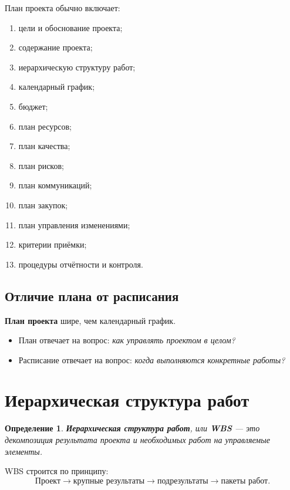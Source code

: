 \documentclass[12pt,a4paper]{article}
\newtheorem{definition}{Определение}
\begin{document}
План проекта обычно включает:
\begin{enumerate}
    \item цели и обоснование проекта;
    \item содержание проекта;
    \item иерархическую структуру работ;
    \item календарный график;
    \item бюджет;
    \item план ресурсов;
    \item план качества;
    \item план рисков;
    \item план коммуникаций;
    \item план закупок;
    \item план управления изменениями;
    \item критерии приёмки;
    \item процедуры отчётности и контроля.
\end{enumerate}

\subsection{Отличие плана от расписания}

\textbf{План проекта} шире, чем календарный график.

\begin{itemize}
    \item План отвечает на вопрос: \textit{как управлять проектом в целом?}
    \item Расписание отвечает на вопрос: \textit{когда выполняются конкретные работы?}
\end{itemize}

\section{Иерархическая структура работ}

\begin{definition}
\textbf{Иерархическая структура работ}, или \textbf{WBS} --- это декомпозиция результата проекта и необходимых работ на управляемые элементы.
\end{definition}

WBS строится по принципу:
\[
\text{Проект} \rightarrow \text{крупные результаты} \rightarrow \text{подрезультаты} \rightarrow \text{пакеты работ}.
\]
\end{document}
